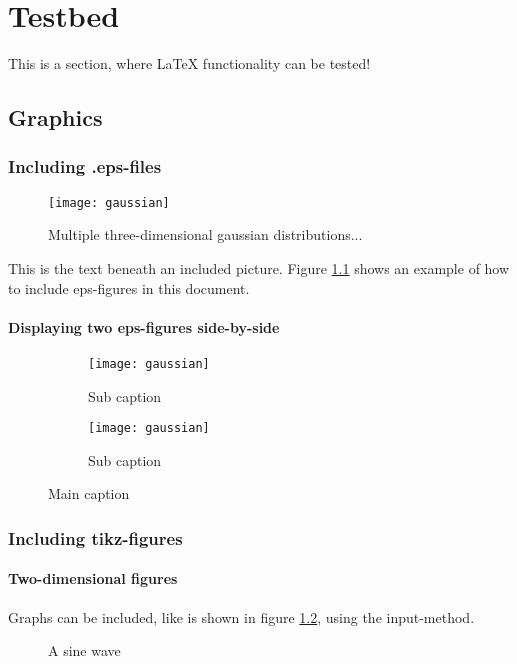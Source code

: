 

\chapter[Testbed]{Testbed}
\label{chap:Testbed}
This is a section, where LaTeX functionality can be tested!
\section{Graphics}
\subsection{Including .eps-files}

\begin{figure}[H]
\centering
\texttt{[image: gaussian]}
\caption{Multiple three-dimensional gaussian distributions...}
\label{fig:mog}
\end{figure}


This is the text beneath an included picture. Figure \ref{fig:mog} shows an example of how to include eps-figures in this document.

\subsubsection{Displaying two eps-figures side-by-side}
\begin{figure}[H]
 \centering
 \begin{subfigure}{0.49\textwidth}
    \texttt{[image: gaussian]}
    \caption{Sub caption}
 \end{subfigure}
 \begin{subfigure}{0.49\textwidth}
    \texttt{[image: gaussian]}
    \caption{Sub caption}
 \end{subfigure}
 \caption{Main caption}
\end{figure}

\subsection{Including tikz-figures}
\subsubsection{Two-dimensional figures}
Graphs can be included, like is shown in figure \ref{fig:sin}, using the input-method.
\begin{figure}[H]
	\centering
	
	\caption{A sine wave}
	\label{fig:sin}
\end{figure}

